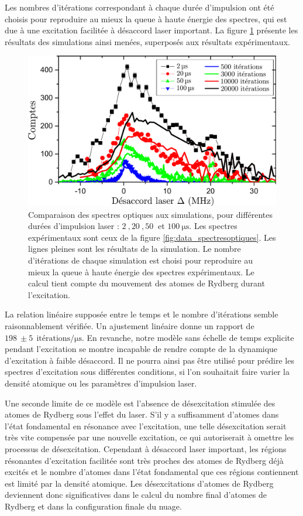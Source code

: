 Les nombres d'itérations correspondant à chaque durée d'impulsion ont été choisis pour reproduire au mieux la queue à haute énergie des spectres, qui est due à une excitation facilitée à désaccord laser important.
La figure \ref{fig:opt_spectra_firstTest} présente les résultats des simulations ainsi menées, superposés aux résultats expérimentaux.
%
\begin{figure}[!h]
\centering
\includegraphics[width=.8\linewidth]{figures/low_l/raies_laser_vieilles_simus}
\caption[Comparaison des spectres optiques au premier modèle de simulation]{
Comparaison des spectres optiques aux simulations, pour différentes durées d'impulsion laser : $\SI{2}{},\SI{20}{},\SI{50}{}$ et $\SI{100}{\us}$.
Les spectres expérimentaux sont ceux de la figure \ref{fig:data_spectresoptiques}.
Les lignes pleines sont les résultats de la simulation.
Le nombre d'itérations de chaque simulation est choisi pour reproduire au mieux la queue à haute énergie des spectres expérimentaux.
Le calcul tient compte du mouvement des atomes de Rydberg durant l'excitation.
}
\label{fig:opt_spectra_firstTest}
\end{figure}
%
La relation linéaire supposée entre le temps et le nombre d'itérations semble raisonnablement vérifiée.
Un ajustement linéaire donne un rapport de $\SI{198}{} \pm \SI{5}{~} \text{itérations}/\si{\us}$.
En revanche, notre modèle sans échelle de temps explicite pendant l'excitation se montre incapable de rendre compte de la dynamique d'excitation à faible désaccord.
Il ne pourra ainsi pas être utilisé pour prédire les spectres d'excitation sous différentes conditions, si l'on souhaitait faire varier la densité atomique ou les paramètres d'impulsion laser.

Une seconde limite de ce modèle est l'absence de désexcitation stimulée des atomes de Rydberg sous l'effet du laser.
S'il y a suffisamment d'atomes dans l'état fondamental en résonance avec l'excitation, une telle désexcitation serait très vite compensée par une nouvelle excitation, ce qui autoriserait à omettre les processus de désexcitation.
Cependant à désaccord laser important, les régions résonantes d'excitation facilitée sont très proches des atomes de Rydberg déjà excités et le nombre d'atomes dans l'état fondamental que ces régions contiennent est limité par la densité atomique.
Les désexcitations d'atomes de Rydberg deviennent donc significatives dans le calcul du nombre final d'atomes de Rydberg et dans la configuration finale du nuage.


